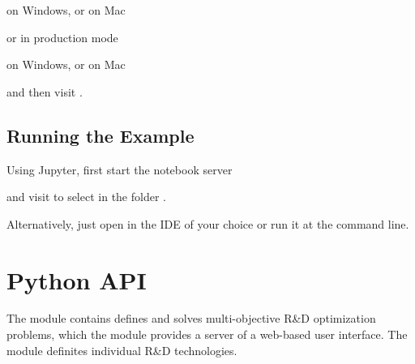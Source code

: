\documentclass[letterpaper,10pt,english]{sphinxmanual}
\begin{document}
\begin{sphinxVerbatim}[commandchars=\\\{\}]
 \PYGZbs{}
\end{sphinxVerbatim}

on Windows, or on Mac

\begin{sphinxVerbatim}[commandchars=\\\{\}]
 
\end{sphinxVerbatim}

or in production mode

\begin{sphinxVerbatim}[commandchars=\\\{\}]
 \PYGZbs{}
\end{sphinxVerbatim}

on Windows, or on Mac

\begin{sphinxVerbatim}[commandchars=\\\{\}]
 
\end{sphinxVerbatim}

and then visit .


\section{Running the Example}
\label{\detokenize{doc-src/getting-started:running-the-example}}
Using Jupyter, first start the notebook server

\begin{sphinxVerbatim}[commandchars=\\\{\}]
 
\end{sphinxVerbatim}

and visit  to select  in the folder .

Alternatively, just open  in the IDE of your
choice or run it at the command line.


\chapter{Python API}
\label{\detokenize{doc-src/modules:python-api}}\label{\detokenize{doc-src/modules::doc}}
The module {\hyperref[\detokenize{doc-src/tyche:module-tyche}]{}} contains defines and solves multi-objective R\&D
optimization problems, which the module {\hyperref[\detokenize{doc-src/eutychia:module-eutychia}]{}} provides a server
of a web-based user interface. The module {\hyperref[\detokenize{doc-src/technology:module-technology}]{}} definites
individual R\&D technologies.
\end{document}
